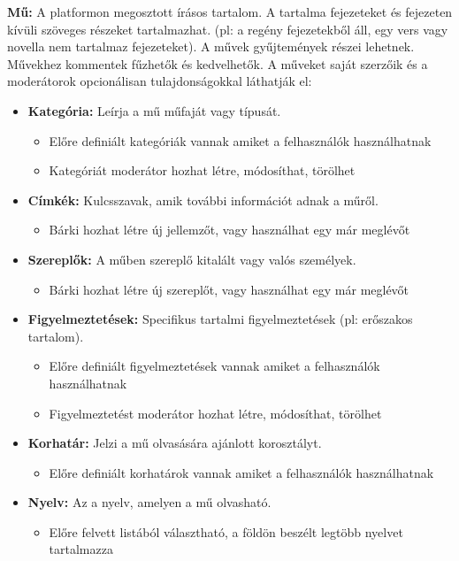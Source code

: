 \textbf{Mű:} A platformon megosztott írásos tartalom. A tartalma fejezeteket és fejezeten kívüli szöveges részeket tartalmazhat. (pl: a regény fejezetekből áll, egy vers vagy novella nem tartalmaz fejezeteket). A művek gyűjtemények részei lehetnek. Művekhez kommentek fűzhetők és kedvelhetők. A műveket saját szerzőik és a moderátorok opcionálisan tulajdonságokkal láthatják el:
\begin{itemize}
    \item \textbf{Kategória:} Leírja a mű műfaját vagy típusát.
    \begin{itemize}
        \item Előre definiált kategóriák vannak amiket a felhasználók használhatnak
        \item Kategóriát moderátor hozhat létre, módosíthat, törölhet
    \end{itemize}
    \item \textbf{Címkék:} Kulcsszavak, amik további információt adnak a műről.
    \begin{itemize}
        \item Bárki hozhat létre új jellemzőt, vagy használhat egy már meglévőt
    \end{itemize}
    \item \textbf{Szereplők:} A műben szereplő kitalált vagy valós személyek.
    \begin{itemize}
        \item Bárki hozhat létre új szereplőt, vagy használhat egy már meglévőt 
    \end{itemize}
    \item \textbf{Figyelmeztetések:} Specifikus tartalmi figyelmeztetések (pl: erőszakos tartalom).
    \begin{itemize}
        \item Előre definiált figyelmeztetések vannak amiket a felhasználók használhatnak
        \item Figyelmeztetést moderátor hozhat létre, módosíthat, törölhet
    \end{itemize}
    \item \textbf{Korhatár:} Jelzi a mű olvasására ajánlott korosztályt.
    \begin{itemize}
        \item Előre definiált korhatárok vannak amiket a felhasználók használhatnak
    \end{itemize}
    \item \textbf{Nyelv:} Az a nyelv, amelyen a mű olvasható.
    \begin{itemize}
        \item Előre felvett listából választható, a földön beszélt legtöbb nyelvet tartalmazza
    \end{itemize}
\end{itemize}

